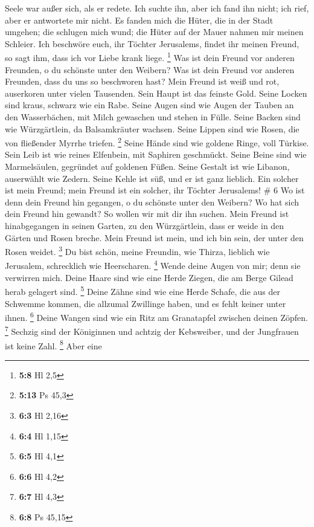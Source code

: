 Seele war außer sich, als er redete. Ich suchte ihn, aber ich fand ihn
nicht; ich rief, aber er antwortete mir nicht.  Es fanden
mich die Hüter, die in der Stadt umgehen; die schlugen mich wund; die
Hüter auf der Mauer nahmen mir meinen Schleier.  Ich
beschwöre euch, ihr Töchter Jerusalems, findet ihr meinen Freund, so
sagt ihm, dass ich vor Liebe krank liege. \footnote{\textbf{5:8} Hl 2,5}
 Was ist dein Freund vor anderen Freunden, o du schönste
unter den Weibern? Was ist dein Freund vor anderen Freunden, dass du uns
so beschworen hast?  Mein Freund ist weiß und rot,
auserkoren unter vielen Tausenden.  Sein Haupt ist das
feinste Gold. Seine Locken sind kraus, schwarz wie ein Rabe.
 Seine Augen sind wie Augen der Tauben an den
Wasserbächen, mit Milch gewaschen und stehen in Fülle. 
Seine Backen sind wie Würzgärtlein, da Balsamkräuter wachsen. Seine
Lippen sind wie Rosen, die von fließender Myrrhe triefen. \footnote{\textbf{5:13}
  Ps 45,3}  Seine Hände sind wie goldene Ringe, voll
Türkise. Sein Leib ist wie reines Elfenbein, mit Saphiren geschmückt.
 Seine Beine sind wie Marmelsäulen, gegründet auf
goldenen Füßen. Seine Gestalt ist wie Libanon, auserwählt wie Zedern.
 Seine Kehle ist süß, und er ist ganz lieblich. Ein
solcher ist mein Freund; mein Freund ist ein solcher, ihr Töchter
Jerusalems! \# 6  Wo ist denn dein Freund hin gegangen, o
du schönste unter den Weibern? Wo hat sich dein Freund hin gewandt? So
wollen wir mit dir ihn suchen.  Mein Freund ist
hinabgegangen in seinen Garten, zu den Würzgärtlein, dass er weide in
den Gärten und Rosen breche.  Mein Freund ist mein, und
ich bin sein, der unter den Rosen weidet. \footnote{\textbf{6:3} Hl 2,16}
 Du bist schön, meine Freundin, wie Thirza, lieblich wie
Jerusalem, schrecklich wie Heerscharen. \footnote{\textbf{6:4} Hl 1,15}
 Wende deine Augen von mir; denn sie verwirren mich. Deine
Haare sind wie eine Herde Ziegen, die am Berge Gilead herab gelagert
sind. \footnote{\textbf{6:5} Hl 4,1}  Deine Zähne sind wie
eine Herde Schafe, die aus der Schwemme kommen, die allzumal Zwillinge
haben, und es fehlt keiner unter ihnen. \footnote{\textbf{6:6} Hl 4,2}
 Deine Wangen sind wie ein Ritz am Granatapfel zwischen
deinen Zöpfen. \footnote{\textbf{6:7} Hl 4,3}  Sechzig
sind der Königinnen und achtzig der Kebsweiber, und der Jungfrauen ist
keine Zahl. \footnote{\textbf{6:8} Ps 45,15}  Aber eine
